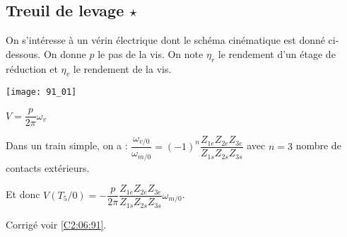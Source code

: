 \normaltrue \difficilefalse \tdifficilefalse
\correctionfalse


\subsection*{Treuil de levage $\star$ \label{C2:06:91}}
\setcounter{question}{0}

\ifcorrection
\else
{}
\fi

\ifprof
\else
On s’intéresse à un vérin électrique dont le schéma cinématique est donné ci-dessous. On donne $p$ le pas de la vis. On note $\eta_r$ le rendement d'un étage de réduction et $\eta_v$ le rendement de la vis.
\begin{center}
\texttt{[image: 91\_01]}
\end{center}


\fi


\ifprof
\begin{corrige}
$V =\dfrac{p}{2\pi} \omega_v$
\end{corrige}
\else
\fi

\ifprof 
\begin{corrige}
Dans un train simple, on a : $\dfrac{\omega_{v/0}}{\omega_{m/0}} = (-1)^n \dfrac{Z_{1e}Z_{2e}Z_{3e}}{Z_{1s}Z_{2s}Z_{3s}}$ avec $n=3$ nombre de contacts extérieurs.

Et donc $V(T_5/0) =-\dfrac{p}{2\pi} \dfrac{Z_{1e}Z_{2e}Z_{3e}}{Z_{1s}Z_{2s}Z_{3s}} \omega_{m/0}$.

\end{corrige}
\else

\fi





\ifprof
\else
\begin{flushright}
\footnotesize{Corrigé  voir \ref{C2:06:91}.}
\end{flushright}%
\fi